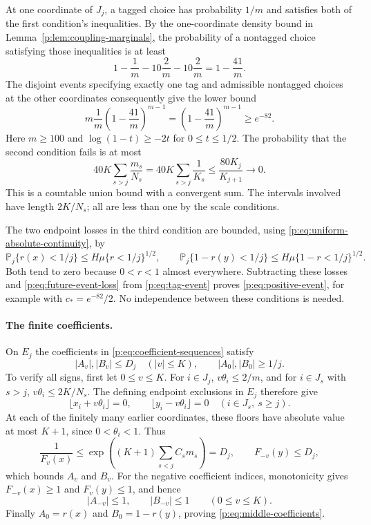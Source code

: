 At one coordinate of $J_j$, a tagged choice has probability $1/m$
and satisfies both of the first condition's inequalities.  By the
one-coordinate density bound in Lemma~\ref{p:lem:coupling-marginals},
the probability of a nontagged choice satisfying those inequalities
is at least
\[
 1-\frac1m-10\frac2m-10\frac2m=1-\frac{41}{m}.
\]
The disjoint events specifying exactly one tag and admissible
nontagged choices at the other coordinates consequently give the
lower bound
\begin{equation}\label{p:eq:tag-event}
 m\frac1m\left(1-\frac{41}{m}\right)^{m-1}
 =\left(1-\frac{41}{m}\right)^{m-1}\ge e^{-82}.
\end{equation}
Here $m\ge100$ and $\log(1-t)\ge-2t$ for $0\le t\le1/2$.
The probability that the second condition fails is at most
\begin{equation}\label{p:eq:future-event-loss}
 40K\sum_{s>j}\frac{m_s}{N_s}
 =40K\sum_{s>j}\frac1{K_s}
 \le\frac{80K_j}{K_{j+1}}\longrightarrow0.
\end{equation}
This is a countable union bound with a convergent sum.  The intervals
involved have length $2K/N_s$; all are less than one by the scale
conditions.

The two endpoint losses in the third condition are bounded, using
\eqref{p:eq:uniform-absolute-continuity}, by
\[
 \mathbb P_j\{r(x)<1/j\}\le H\mu\{r<1/j\}^{1/2},
 \qquad
 \mathbb P_j\{1-r(y)<1/j\}\le H\mu\{1-r<1/j\}^{1/2}.
\]
Both tend to zero because $0<r<1$ almost everywhere.  Subtracting
these losses and \eqref{p:eq:future-event-loss} from
\eqref{p:eq:tag-event} proves \eqref{p:eq:positive-event}, for example
with $c_*=e^{-82}/2$.  No independence between these conditions is
needed.

\paragraph{The finite coefficients.}
On $E_j$ the coefficients in \eqref{p:eq:coefficient-sequences} satisfy
\begin{equation}\label{p:eq:middle-coefficients}
 |A_v|,|B_v|\le D_j\quad(|v|\le K),
 \qquad |A_0|,|B_0|\ge1/j.
\end{equation}
To verify all signs, first let $0\le v\le K$.  For $i\in J_j$,
$v\theta_i\le2/m$, and for $i\in J_s$ with $s>j$,
$v\theta_i\le2K/N_s$.  The defining endpoint exclusions in $E_j$
therefore give
\[
 \lfloor x_i+v\theta_i\rfloor=0,
 \qquad \lfloor y_i-v\theta_i\rfloor=0
 \quad(i\in J_s,\ s\ge j).
\]
At each of the finitely many earlier coordinates, these floors have
absolute value at most $K+1$, since $0<\theta_i<1$.  Thus
\[
 \frac1{F_v(x)}\le
 \exp\left((K+1)\sum_{s<j}C_sm_s\right)=D_j,
 \qquad F_{-v}(y)\le D_j,
\]
which bounds $A_v$ and $B_v$.  For the negative coefficient indices,
monotonicity gives $F_{-v}(x)\ge1$ and $F_v(y)\le1$, and hence
\[
 |A_{-v}|\le1,\qquad |B_{-v}|\le1\qquad(0\le v\le K).
\]
Finally $A_0=r(x)$ and $B_0=1-r(y)$, proving
\eqref{p:eq:middle-coefficients}.

